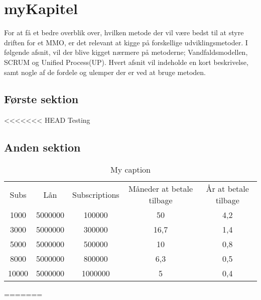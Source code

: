 \cfoot{\page\textbackslash \totalp} %
\chapter{myKapitel}
For at få et bedre overblik over, hvilken metode der vil være bedst til at styre driften for et MMO, er det relevant at kigge på forskellige udviklingsmetoder. I følgende afsnit, vil der blive kigget nærmere på metoderne; Vandfaldsmodellen, SCRUM og Unified Process(UP). Hvert afsnit vil indeholde en kort beskrivelse, samt nogle af de fordele og ulemper der er ved at bruge metoden.\\
\section{Første sektion}
<<<<<<< HEAD
Testing
\section{Anden sektion}
\begin{table}[]
\centering
\caption{My caption}
\label{my-label}
\begin{tabular}{|c|c|c|c|c|}
Subs  & Lån     & Subscriptions & Måneder at betale tilbage & År at betale tilbage \\
1000  & 5000000 & 100000        & 50                        & 4,2                  \\
3000  & 5000000 & 300000        & 16,7                      & 1,4                  \\
5000  & 5000000 & 500000        & 10                        & 0,8                  \\
8000  & 5000000 & 800000        & 6,3                       & 0,5                  \\
10000 & 5000000 & 1000000       & 5                         & 0,4                 
\end{tabular}
\end{table}

=======


